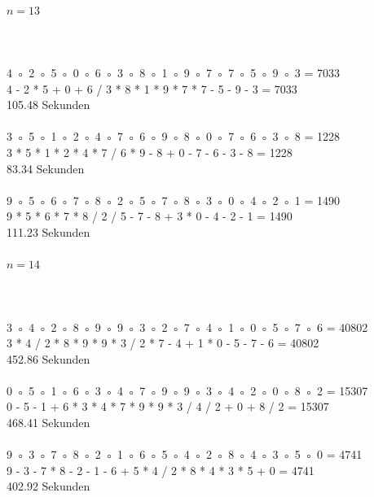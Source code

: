 \documentclass[a4paper,10pt,ngerman]{scrartcl}
\begin{document}
\paragraph{$n=13$} \hrulefill
\\
\\
4 ◦ 2 ◦ 5 ◦ 0 ◦ 6 ◦ 3 ◦ 8 ◦ 1 ◦ 9 ◦ 7 ◦ 7 ◦ 5 ◦ 9 ◦ 3 = 7033\\
4 - 2 * 5 + 0 + 6 / 3 * 8 * 1 * 9 * 7 * 7 - 5 - 9 - 3 = 7033\\
105.48 Sekunden\\
\\
3 ◦ 5 ◦ 1 ◦ 2 ◦ 4 ◦ 7 ◦ 6 ◦ 9 ◦ 8 ◦ 0 ◦ 7 ◦ 6 ◦ 3 ◦ 8 = 1228\\
3 * 5 * 1 * 2 * 4 * 7 / 6 * 9 - 8 + 0 - 7 - 6 - 3 - 8 = 1228\\
83.34 Sekunden\\
\\
9 ◦ 5 ◦ 6 ◦ 7 ◦ 8 ◦ 2 ◦ 5 ◦ 7 ◦ 8 ◦ 3 ◦ 0 ◦ 4 ◦ 2 ◦ 1 = 1490\\
9 * 5 * 6 * 7 * 8 / 2 / 5 - 7 - 8 + 3 * 0 - 4 - 2 - 1 = 1490\\
111.23 Sekunden\\
\paragraph{$n=14$} \hrulefill
\\
\\
3 ◦ 4 ◦ 2 ◦ 8 ◦ 9 ◦ 9 ◦ 3 ◦ 2 ◦ 7 ◦ 4 ◦ 1 ◦ 0 ◦ 5 ◦ 7 ◦ 6 = 40802\\
3 * 4 / 2 * 8 * 9 * 9 * 3 / 2 * 7 - 4 + 1 * 0 - 5 - 7 - 6 = 40802\\
452.86 Sekunden\\
\\
0 ◦ 5 ◦ 1 ◦ 6 ◦ 3 ◦ 4 ◦ 7 ◦ 9 ◦ 9 ◦ 3 ◦ 4 ◦ 2 ◦ 0 ◦ 8 ◦ 2 = 15307\\
0 - 5 - 1 + 6 * 3 * 4 * 7 * 9 * 9 * 3 / 4 / 2 + 0 + 8 / 2 = 15307\\
468.41 Sekunden\\
\\
9 ◦ 3 ◦ 7 ◦ 8 ◦ 2 ◦ 1 ◦ 6 ◦ 5 ◦ 4 ◦ 2 ◦ 8 ◦ 4 ◦ 3 ◦ 5 ◦ 0 = 4741\\
9 - 3 - 7 * 8 - 2 - 1 - 6 + 5 * 4 / 2 * 8 * 4 * 3 * 5 + 0 = 4741\\
402.92 Sekunden\\
\end{document}
